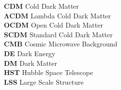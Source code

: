 \textbf{CDM} \hspace{0.5cm}   {Cold Dark Matter}  \\
$\boldsymbol{\Lambda CDM}$ \hspace{0.5cm}  {Lambda Cold Dark Matter} \\
\textbf{OCDM}  \hspace{0.5cm}  {Open Cold Dark Matter} \\
\textbf{SCDM} \hspace{0.5cm}  {Standard Cold Dark Matter} \\
\textbf{CMB}  \hspace{0.5cm}  {Cosmic Microwave Background} \\
\textbf{DE}   \hspace{0.5cm} {Dark Energy} \\
\textbf{DM}  \hspace{0.5cm}  {Dark Matter} \\
\textbf{HST}  \hspace{0.5cm}  {Hubble Space Telescope} \\
\textbf{LSS}  \hspace{0.5cm}  {Large Scale Structure} \\
